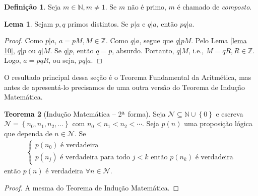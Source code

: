\documentclass[a4paper,11pt,twoside, leqno]{article}
\theoremstyle{definition}
\newtheorem{theorem}{Teorema}[section]
\newtheorem*{definition}{Definição}
\newtheorem{lemma}[theorem]{Lema}
\begin{document}
\begin{definition}
	Seja $m\in\mathbb{N}, m\neq 1$. Se $m$ não é primo, $m$ é chamado de {\em composto}.
\end{definition}
\begin{lemma}
	\label{lema 13}
	Sejam $p,q$ primos distintos. Se $p|a$ e $q|a$, então $pq|a$.
\end{lemma}
\begin{proof}
	Como $p|a$, $a = pM, M\in\mathbb{Z}$. Como $q|a$, segue que $q|pM$. Pelo Lema \eqref{lema 10}, $q|p$ ou $q|M$. Se $q|p$, então $q=p$, absurdo. Portanto, $q|M$, i.e., $M = qR, R\in\mathbb{Z}$. Logo, $a = pqR$, ou seja, $pq|a$.
\end{proof}
\par O resultado principal dessa seção é o Teorema Fundamental da Aritmética, mas antes de apresentá-lo precisamos de uma outra versão do Teorema de Indução Matemática.
\begin{theorem}[Indução Matemática -- 2$^{\text{\underline{a}}}$ forma]
	Seja $\mathcal{N}\subseteq\mathbb{N}\cup\left\{0\right\}$ e escreva $\mathcal{N} = \left\{ n_0, n_1, n_2, \dots  \right\}$ com $n_0 < n_1 <n_2 < \cdots $. Seja $p(n)$ uma proposição lógica que dependa de $n\in\mathcal{N}$. Se
	\begin{align*}
	\begin{cases}
	p(n_0) \text{ é verdadeira } \\
	p(n_j) \text{ é verdadeira para todo } j<k \text{ então } p(n_k) \text{ é verdadeira}
	\end{cases}
	\end{align*}
	então $p(n)$ é verdadeira $\forall n\in\mathcal{N}$.
\end{theorem}
\begin{proof}
	A mesma do Teorema de Indução Matemática.
\end{proof}
\end{document}
